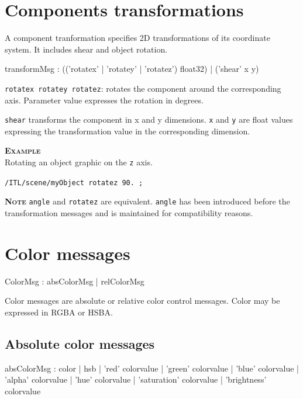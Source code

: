 \documentclass[a4paper,twoside]{report}
\newcommand{\sublevel}[1]	{\section{#1}}
\newcommand{\subsublevel}[1]	{\subsection{#1}}
\newcommand{\OSC}[1]		{\texttt{#1}}
\newcommand{\example}		{\textbf{\hspace{-1.5cm}\textbf{\textsc{Example }}}}
\newcommand{\note}	[1]		{\vspace{2mm}\textbf{\hspace{-1.03cm}\textbf{\textsc{Note #1}}}}
\let\olditemize\itemize
\let\oldenditemize\enditemize
\renewenvironment{itemize} 	{\olditemize \setlength{\itemsep}{1mm}}{\oldenditemize}
\newcommand{\sample}	[1]			{\vspace{-2mm}\begin{center}\colorbox{mygrey}{
								\begin{minipage}[t]{0.9\columnwidth} 
								{\small \texttt{#1}}
								\end{minipage}}\end{center}}
\begin{document}
\sublevel{Components transformations}
\label{transform}

A component tranformation specifies 2D transformations of its coordinate system. It includes shear and object rotation.

\begin{rail}
transformMsg :
			(('rotatex' | 'rotatey' | 'rotatez') float32)
		| 	('shear' x y)
\end{rail}

\begin{itemize}
\item \OSC{rotatex rotatey rotatez}: rotates the component around the corresponding axis. Parameter value expresses the rotation in degrees.
\item \OSC{shear} transforms the component in x and y dimensions. \OSC{x} and \OSC{y} are float values expressing the transformation value in the corresponding dimension.
\end{itemize}

\example \\
Rotating an object graphic on the \OSC{z} axis.
\sample{/ITL/scene/myObject rotatez 90. ;}

\note{} \OSC{angle} and \OSC{rotatez} are equivalent. \OSC{angle} has been introduced before the transformation messages and is maintained for compatibility reasons.

\sublevel{Color messages}
\label{colormsg}


\begin{rail}
ColorMsg : 	absColorMsg 
			|	relColorMsg 
\end{rail}

Color messages are absolute or relative color control messages. Color may be expressed in RGBA or HSBA.

\subsublevel{Absolute color messages}

\begin{rail}
absColorMsg :    color
			| hsb
			| 'red' colorvalue
			| 'green' colorvalue
			| 'blue' colorvalue
			| 'alpha' colorvalue
			| 'hue' colorvalue
			| 'saturation' colorvalue
			| 'brightness' colorvalue
\end{rail}
\end{document}
